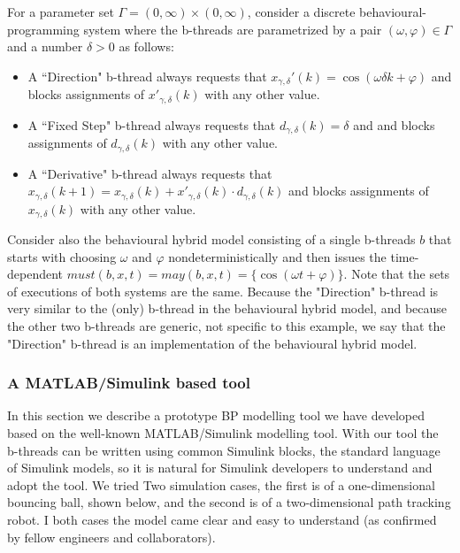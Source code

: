 \documentclass[11pt]{article}
\newcounter{example}
\begin{document}
\begin{example}
	\label{ex:sin}
	For a parameter set $\Gamma = (0,\infty)\times (0,\infty)$, consider a discrete behavioural-programming system where the b-threads are parametrized by a pair $(\omega,\varphi) \in \Gamma$ and a number $\delta >0$ as follows:
	\begin{itemize}
		\item A ``Direction" b-thread always requests that $x_{\gamma,\delta}'(k) = \cos(\omega\delta k + \varphi)$ and blocks assignments of $x'_{\gamma,\delta}(k)$ with any other value.
		\item A ``Fixed Step" b-thread always requests that $d_{\gamma,\delta}(k) = \delta$ and and blocks  assignments of $d_{\gamma,\delta}(k)$ with any other value.
		\item A ``Derivative" b-thread always requests that $x_{\gamma,\delta}(k+1) = x_{\gamma,\delta}(k) +  {x}'_{\gamma,\delta}(k)\cdot  d_{\gamma,\delta}(k)$ and blocks assignments of $x_{\gamma,\delta}(k)$ with any other value.
	\end{itemize}
	Consider also the  behavioural hybrid model consisting of a single b-threads $b$ that starts with choosing $\omega$ and $\varphi$ nondeterministically and then issues the time-dependent $must(b,x,t)=may(b,x,t)=\{  \cos(\omega t + \varphi )\}$. Note that the sets of executions of both systems are the same. Because the "Direction" b-thread is very similar to the (only) b-thread in the behavioural hybrid model, and because the  other two b-threads are generic, not specific to this example, we say that the "Direction" b-thread is an implementation of the behavioural hybrid model.
\end{example}

\subsubsection{A MATLAB/Simulink based tool}
\label{sec:simulink}
In this section we describe a prototype BP modelling tool we have developed based on the well-known MATLAB/Simulink modelling tool. With our tool the b-threads can be written using common Simulink blocks, the standard language of Simulink models, so it is natural for Simulink developers to understand and adopt the tool. We tried Two simulation cases, the first is of a one-dimensional bouncing ball, shown below, and the second is of a two-dimensional path tracking robot. I both cases the model came clear and easy to understand (as confirmed by fellow engineers and collaborators).
\end{document}

